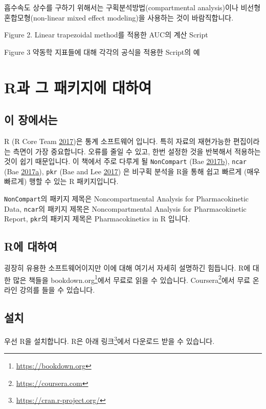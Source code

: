 \documentclass[12pt,]{krantz}
\let\rmarkdownfootnote\footnote%
\def\footnote{\protect\rmarkdownfootnote}
\theoremstyle{definition}
\theoremstyle{definition}
\theoremstyle{definition}
\theoremstyle{remark}
\begin{document}
흡수속도 상수를 구하기 위해서는 구획분석방법(compartmental analysis)이나
비선형 혼합모형(non-linear mixed effect modeling)을 사용하는 것이
바람직합니다.

Figure 2. Linear trapezoidal method를 적용한 AUC의 계산 Script

Figure 3 약동학 지표들에 대해 각각의 공식을 적용한 Script의 예

\chapter{R과 그 패키지에 대하여}\label{R-and-packages}

\section{이 장에서는}\label{summary-r-packages}

R (R Core Team \protect\hyperlink{ref-R-base}{2017})은 통계 소프트웨어
입니다. 특히 자료의 재현가능한 편집이라는 측면이 가장 중요합니다. 오류를
줄일 수 있고, 한번 설정한 것을 반복해서 적용하는 것이 쉽기 때문입니다.
이 책에서 주로 다루게 될 \texttt{NonCompart} (Bae
\protect\hyperlink{ref-R-NonCompart}{2017}\protect\hyperlink{ref-R-NonCompart}{b}),
\texttt{ncar} (Bae
\protect\hyperlink{ref-R-ncar}{2017}\protect\hyperlink{ref-R-ncar}{a}),
\texttt{pkr} (Bae and Lee \protect\hyperlink{ref-R-pkr}{2017}) 은 비구획
분석을 R을 통해 쉽고 빠르게 (매우 빠르게) 행할 수 있는 R 패키지입니다.

\texttt{NonCompart}의 패키지 제목은 Noncompartmental Analysis for
Pharmacokinetic Data, \texttt{ncar}의 패키지 제목은 Noncompartmental
Analysis for Pharmacokinetic Report, \texttt{pkr}의 패키지 제목은
Pharmacokinetics in R 입니다.

\section{R에 대하여}\label{basic}

굉장히 유용한 소프트웨어이지만 이에 대해 여기서 자세히 설명하긴
힘듭니다. R에 대한 많은 책들을 bookdown.org\footnote{\url{https://bookdown.org}}에서
무료로 읽을 수 있습니다. Coursera\footnote{\url{https://coursera.com}}에서
무료 온라인 강의를 들을 수 있습니다.

\section{설치}\label{install}

우선 R을 설치합니다. R은 아래 링크\footnote{\url{https://cran.r-project.org/}}에서
다운로드 받을 수 있습니다.
\end{document}
